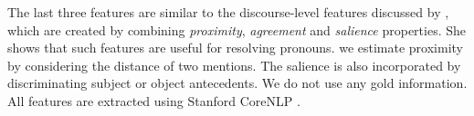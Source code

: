 The last three features are similar to the discourse-level features discussed by ,
which are created by combining \emph{proximity}, \emph{agreement} and \emph{salience} properties.
She shows that such features are useful for resolving pronouns.
we estimate proximity by considering the distance of two mentions.
The salience is also incorporated by discriminating subject or object antecedents.  
We do not use any gold information. All features are extracted using Stanford CoreNLP \cite{corenlp}.
